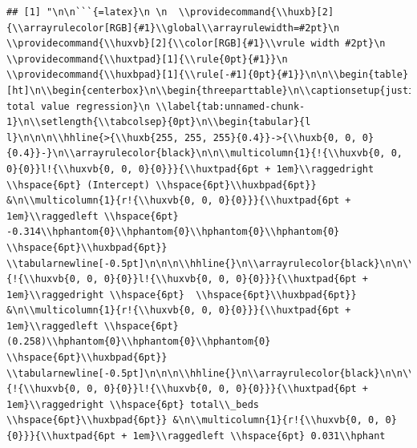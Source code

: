 \documentclass[11pt,preprint, authoryear]{elsarticle}
\let\origtable\table
\let\endorigtable\endtable
\renewenvironment{table}[1][2] {
    \expandafter\origtable\expandafter[H]
} {
    \endorigtable
}
\numberwithin{equation}{section}
\numberwithin{figure}{section}
\numberwithin{table}{section}
\begin{document}
\begin{verbatim}
## [1] "\n\n```{=latex}\n \n  \\providecommand{\\huxb}[2]{\\arrayrulecolor[RGB]{#1}\\global\\arrayrulewidth=#2pt}\n  \\providecommand{\\huxvb}[2]{\\color[RGB]{#1}\\vrule width #2pt}\n  \\providecommand{\\huxtpad}[1]{\\rule{0pt}{#1}}\n  \\providecommand{\\huxbpad}[1]{\\rule[-#1]{0pt}{#1}}\n\n\\begin{table}[ht]\n\\begin{centerbox}\n\\begin{threeparttable}\n\\captionsetup{justification=centering,singlelinecheck=off}\n\\caption{Auction total value regression}\n \\label{tab:unnamed-chunk-1}\n\\setlength{\\tabcolsep}{0pt}\n\\begin{tabular}{l l}\n\n\n\\hhline{>{\\huxb{255, 255, 255}{0.4}}->{\\huxb{0, 0, 0}{0.4}}-}\n\\arrayrulecolor{black}\n\n\\multicolumn{1}{!{\\huxvb{0, 0, 0}{0}}l!{\\huxvb{0, 0, 0}{0}}}{\\huxtpad{6pt + 1em}\\raggedright \\hspace{6pt} (Intercept) \\hspace{6pt}\\huxbpad{6pt}} &\n\\multicolumn{1}{r!{\\huxvb{0, 0, 0}{0}}}{\\huxtpad{6pt + 1em}\\raggedleft \\hspace{6pt} -0.314\\hphantom{0}\\hphantom{0}\\hphantom{0}\\hphantom{0} \\hspace{6pt}\\huxbpad{6pt}} \\tabularnewline[-0.5pt]\n\n\n\\hhline{}\n\\arrayrulecolor{black}\n\n\\multicolumn{1}{!{\\huxvb{0, 0, 0}{0}}l!{\\huxvb{0, 0, 0}{0}}}{\\huxtpad{6pt + 1em}\\raggedright \\hspace{6pt}  \\hspace{6pt}\\huxbpad{6pt}} &\n\\multicolumn{1}{r!{\\huxvb{0, 0, 0}{0}}}{\\huxtpad{6pt + 1em}\\raggedleft \\hspace{6pt} (0.258)\\hphantom{0}\\hphantom{0}\\hphantom{0} \\hspace{6pt}\\huxbpad{6pt}} \\tabularnewline[-0.5pt]\n\n\n\\hhline{}\n\\arrayrulecolor{black}\n\n\\multicolumn{1}{!{\\huxvb{0, 0, 0}{0}}l!{\\huxvb{0, 0, 0}{0}}}{\\huxtpad{6pt + 1em}\\raggedright \\hspace{6pt} total\\_beds \\hspace{6pt}\\huxbpad{6pt}} &\n\\multicolumn{1}{r!{\\huxvb{0, 0, 0}{0}}}{\\huxtpad{6pt + 1em}\\raggedleft \\hspace{6pt} 0.031\\hphant
\end{verbatim}
\end{document}
